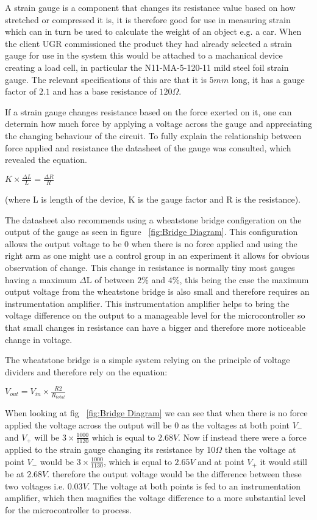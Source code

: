 A strain gauge is a component that changes its resistance value based on how stretched or compressed it is, it is therefore good for use in measuring strain which can in turn be used to calculate the weight of an object e.g. a car. When the client UGR commissioned the product they had already selected a strain gauge for use in the system this would be attached to a machanical device creating a load cell, in particular the N11-MA-5-120-11 mild steel foil strain gauge. The relevant specifications of this are that it is $5mm$ long, it has a gauge factor of $2.1$ and has a base resistance of $120\Omega$.

If a strain gauge changes resistance based on the force exerted on it, one can determin how much force by applying a voltage across the gauge and appreciating the changing behaviour of the circuit. To fully explain the relationship between force applied and resistance the datasheet of the gauge was consulted, which revealed the equation.


\centerline{$K \times \frac{\Delta L}{L} = \frac{\Delta R}{R}$}

 (where L is length of the device, K is the gauge factor and R is the resistance).  

The datasheet also recommends using a wheatstone bridge configeration on the output of the gauge as seen in figure ~\ref{fig:Bridge Diagram}. This configuration allows the output voltage to be $0$ when there is no force applied and using the right arm as one might use a control group in an experiment it allows for obvious observation of change. This change in resistance is normally tiny most gauges having a maximum $\Delta$L of between $2\%$ and $4\%$, this being the case the maximum output voltage from the wheatstone bridge is also small and therefore requires an instrumentation amplifier. This instrumentation amplifier helps to bring the voltage difference on the output to a manageable level for the microcontroller so that small changes in resistance can have a bigger and therefore more noticeable change in voltage. 

The wheatstone bridge is a simple system relying on the principle of voltage dividers and therefore rely on the equation:

\centerline{$V_{out} = V_{in} \times \frac{R2}{R_{total}}$}

When looking at fig ~\ref{fig:Bridge Diagram} we can see that when there is no force applied the voltage across the output will be $0$ as the voltages at both point $V_-$ and $V_+$ will be $3 \times \frac{1000}{1120}$ which is equal to $2.68V$. Now if instead there were a force applied to the strain gauge changing its resistance by 10$\Omega$ then the voltage at point $V_-$ would be $3 \times \frac{1000}{1130}$, which is equal to $2.65V$ and at point $V_+$ it would still be at $2.68V$. therefore the output voltage would be the difference between these two voltages i.e. $0.03V$. The voltage at both points is fed to an instrumentation amplifier, which then magnifies the voltage difference to a more substantial level for the microcontroller to process. 


